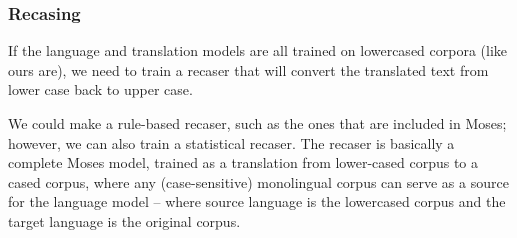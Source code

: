 \begin{comment}
For tagging Russian, we used TreeTagger software\footnote{\url{http://www.cis.uni-muenchen.de/~schmid/tools/TreeTagger/}, also see \cite{treetagger1} and \cite{treetagger2}} with a Russian parameter file\footnote{trained on a corpus created by Serge Sharoff, see \url{http://corpus.leeds.ac.uk/mocky/}}. TreeTagger is a closed-source software with a restrictive license, but for free for research purposes.

For Czech, we used tokenizer from UFAL project Treex (described further in section XXX) and for lemmatizing, we used morphological analyzer Morče (\url{http://ufal.mff.cuni.cz/morce/references.php}); however, as described further, in the final system we didn't actually use its output.

With further experimenting, we discovered that using not lemma on the source side, but a \emph{very crude} stem -- just using the first $n$ letters of a word -- gets better results.\footnote{Using stems instead of lemmas is suggested for example in \cite{stemy}. However, their stems are more linguistically motivated, while we just crudely take first few letters. It's actually debatable if our \uv{stems} can be called stems at all.} 
The model is illustrated on Figure~\ref{graf:backoff}, on the right.

\grafff{stem-plot-csru}{Comparison of various set-ups}{100}

The results of our experiment are seen on Figure~\ref{graf:stem-plot-csru} -- \emph{baseline} is original moses with no factors, \emph{1-lemma} and \emph{1-stem} are the \uv{backoff} models without the main model, and \emph{2-stem} and \emph{2-lemma} are the whole models with backoff.
 
We can see that stem with length 6 gets the best results. So, we used stemma with the length 6 in further experiments, such as the WMT submission \cite{mujpaper}.

\end{comment}

\subsubsection{Recasing}
If the language and translation models are all trained on lowercased corpora (like ours are), we need to train a recaser that will convert the translated text from lower case back to upper case.

We could make a rule-based recaser, such as the ones that are included in Moses; however, we can also train a statistical recaser. 
The recaser is basically a complete Moses model, trained as a translation from lower-cased corpus to a cased corpus, where any (case-sensitive) monolingual corpus can serve as a source for the language model -- where source language is the lowercased corpus and the target language is the original corpus. 

